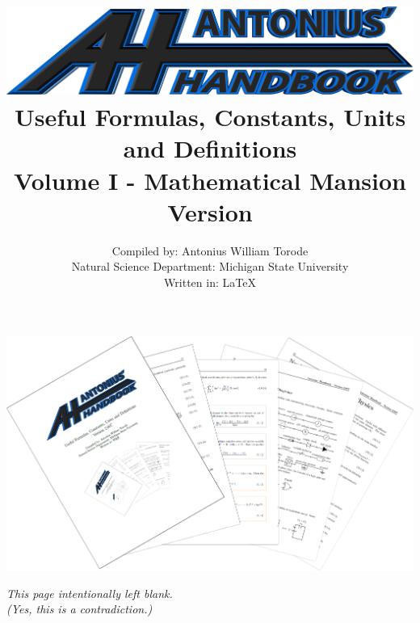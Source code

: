 \documentclass[openany,twoside, notitlepage,letterpaper,11pt]{book}
\title{\includegraphics[scale=.22]{./Images/Covers/AH2.png}
	\\ \vspace{1.5cm} Useful Formulas, Constants, Units and Definitions \\ Volume I - Mathematical Mansion \\ Version \Version}
\date{}
\author{Compiled by: Antonius William Torode\\ Natural Science Department: Michigan State University \\ Written in: \LaTeX}
\begin{document}
\frontmatter
\maketitle
\thispagestyle{empty}
\pagestyle{empty}
\begin{center}
	\includegraphics[scale=1.8]{./Images/Covers/background_tunnel.png}
\end{center}





\thispagestyle{empty}
\newpage
{}
\begin{center}
	\textit{This page intentionally left blank.\\ (Yes, this is a contradiction.)}
\end{center}

\tableofcontents


\setlength{\parindent}{0pt}
\mainmatter
\pagestyle{fancy}


\newpage


\newpage


\newpage


\newpage


\newpage
	

\newpage


\newpage

\end{document}
